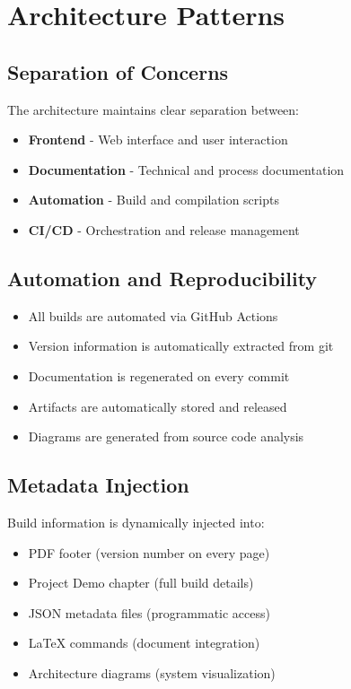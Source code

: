 \section{Architecture Patterns}
\label{sec:ArchPatterns}

\subsection{Separation of Concerns}

The architecture maintains clear separation between:

\begin{itemize}
    \item \textbf{Frontend} - Web interface and user interaction
    \item \textbf{Documentation} - Technical and process documentation
    \item \textbf{Automation} - Build and compilation scripts
    \item \textbf{CI/CD} - Orchestration and release management
\end{itemize}

\subsection{Automation and Reproducibility}

\begin{itemize}
    \item All builds are automated via GitHub Actions
    \item Version information is automatically extracted from git
    \item Documentation is regenerated on every commit
    \item Artifacts are automatically stored and released
    \item Diagrams are generated from source code analysis
\end{itemize}

\subsection{Metadata Injection}

Build information is dynamically injected into:

\begin{itemize}
    \item PDF footer (version number on every page)
    \item Project Demo chapter (full build details)
    \item JSON metadata files (programmatic access)
    \item LaTeX commands (document integration)
    \item Architecture diagrams (system visualization)
\end{itemize}

